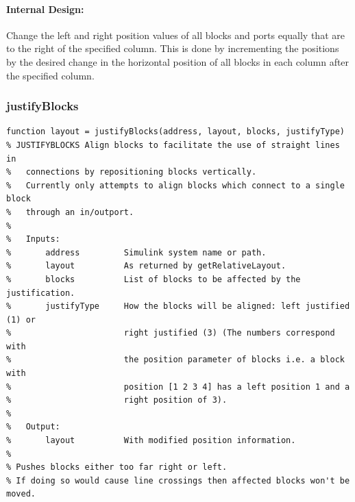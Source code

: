 \documentclass[12pt,letterpaper]{report}
\begin{document}
\paragraph{Internal Design:} Change the left and right position values of all blocks and ports equally that are to the right of the specified column. This is done by incrementing the positions by the desired change in the horizontal position of all blocks in each column after the specified column.

\subsubsection{justifyBlocks}
\begin{lstlisting}
function layout = justifyBlocks(address, layout, blocks, justifyType)
% JUSTIFYBLOCKS Align blocks to facilitate the use of straight lines in
%   connections by repositioning blocks vertically.
%   Currently only attempts to align blocks which connect to a single block
%   through an in/outport.
%
%   Inputs:
%       address         Simulink system name or path.
%       layout          As returned by getRelativeLayout.
%       blocks          List of blocks to be affected by the justification.
%       justifyType     How the blocks will be aligned: left justified (1) or
%                       right justified (3) (The numbers correspond with
%                       the position parameter of blocks i.e. a block with
%                       position [1 2 3 4] has a left position 1 and a
%                       right position of 3).
%
%   Output:
%       layout          With modified position information.
%
% Pushes blocks either too far right or left.
% If doing so would cause line crossings then affected blocks won't be moved.
\end{lstlisting}
\end{document}
